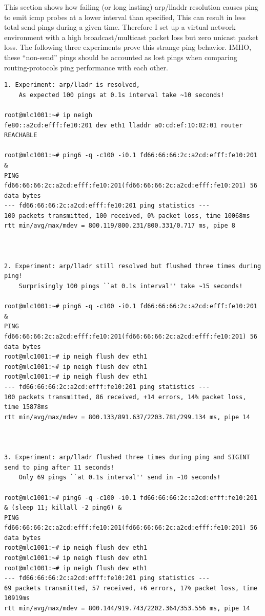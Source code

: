 \documentclass[a4paper,12pt,twoside]{article}
\begin{document}
This section shows how failing (or long lasting) arp/lladdr resolution
causes ping to emit icmp probes at a lower interval than specified,
This can result in less total send pings during a given time.
Therefore I set up a virtual network environment with a high
broadcast/multicast packet loss but zero unicast packet loss.
The following three experiments prove this strange ping behavior.
IMHO, these ``non-send'' pings should be accounted as lost pings when
comparing routing-protocols ping performance with each other.



\begin{verbatim}
1. Experiment: arp/lladr is resolved,
    As expected 100 pings at 0.1s interval take ~10 seconds!

root@mlc1001:~# ip neigh
fe80::a2cd:efff:fe10:201 dev eth1 lladdr a0:cd:ef:10:02:01 router REACHABLE

root@mlc1001:~# ping6 -q -c100 -i0.1 fd66:66:66:2c:a2cd:efff:fe10:201 &
PING fd66:66:66:2c:a2cd:efff:fe10:201(fd66:66:66:2c:a2cd:efff:fe10:201) 56 data bytes
--- fd66:66:66:2c:a2cd:efff:fe10:201 ping statistics ---
100 packets transmitted, 100 received, 0% packet loss, time 10068ms
rtt min/avg/max/mdev = 800.119/800.231/800.331/0.717 ms, pipe 8



2. Experiment: arp/lladr still resolved but flushed three times during ping!
    Surprisingly 100 pings ``at 0.1s interval'' take ~15 seconds!

root@mlc1001:~# ping6 -q -c100 -i0.1 fd66:66:66:2c:a2cd:efff:fe10:201 &
PING fd66:66:66:2c:a2cd:efff:fe10:201(fd66:66:66:2c:a2cd:efff:fe10:201) 56 data bytes
root@mlc1001:~# ip neigh flush dev eth1
root@mlc1001:~# ip neigh flush dev eth1
root@mlc1001:~# ip neigh flush dev eth1
--- fd66:66:66:2c:a2cd:efff:fe10:201 ping statistics ---
100 packets transmitted, 86 received, +14 errors, 14% packet loss, time 15878ms
rtt min/avg/max/mdev = 800.133/891.637/2203.781/299.134 ms, pipe 14



3. Experiment: arp/lladr flushed three times during ping and SIGINT send to ping after 11 seconds!
    Only 69 pings ``at 0.1s interval'' send in ~10 seconds!

root@mlc1001:~# ping6 -q -c100 -i0.1 fd66:66:66:2c:a2cd:efff:fe10:201 & (sleep 11; killall -2 ping6) &
PING fd66:66:66:2c:a2cd:efff:fe10:201(fd66:66:66:2c:a2cd:efff:fe10:201) 56 data bytes
root@mlc1001:~# ip neigh flush dev eth1
root@mlc1001:~# ip neigh flush dev eth1
root@mlc1001:~# ip neigh flush dev eth1
--- fd66:66:66:2c:a2cd:efff:fe10:201 ping statistics ---
69 packets transmitted, 57 received, +6 errors, 17% packet loss, time 10919ms
rtt min/avg/max/mdev = 800.144/919.743/2202.364/353.556 ms, pipe 14
\end{verbatim}
\end{document}
